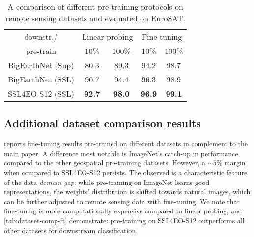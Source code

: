 \documentclass[lettersize,journal]{IEEEtran}
\begin{document}
\begin{table}[h!]
\centering
\caption{A comparison of different pre-training protocols on remote sensing datasets and evaluated on EuroSAT.}
\label{tab:rs-sup}
\begin{tabular}{ccccc}
\hline
downstr./                 & \multicolumn{2}{c}{Linear probing} & \multicolumn{2}{c}{Fine-tuning} \\
pre-train                   & 10\%     & 100\%   & 10\%   & 100\%  \\ \hline \hline
BigEarthNet (Sup) & 80.3             & 89.3            & 94.2           & 98.7           \\
BigEarthNet (SSL) & 90.7             & 94.4            & 96.3           & 98.9           \\
SSL4EO-S12 (SSL)  & \textbf{92.7}    & \textbf{98.0}   & \textbf{96.9}  & \textbf{99.1}  \\ \hline
\end{tabular}
\end{table}




\subsection{\textbf{Additional dataset comparison results}}

 reports fine-tuning results pre-trained on different datasets in complement to the main paper. A difference most notable is ImageNet's catch-up in performance compared to the other geospatial pre-training datasets. However, a $\sim5\%$ margin when compared to SSL4EO-S12 persists. The observed is a characteristic feature of the data \textit{domain gap}: while pre-training on ImageNet learns good representations, the weights' distribution is shifted towards natural images, which can be further adjusted to remote sensing data with fine-tuning. We note that fine-tuning is more computationally expensive compared to linear probing, and \cref{tab:dataset-comp-ft} demonstrate: pre-training on SSL4EO-S12 outperforms all other datasets for downstream classification.
\end{document}
